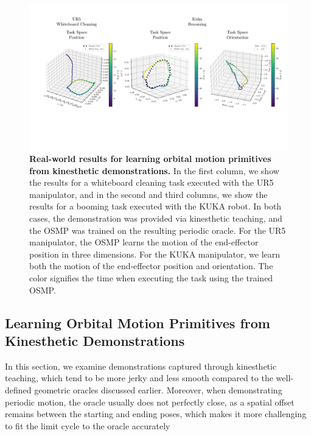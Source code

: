 \begin{figure}
    \centering
    \includegraphics[width=1.0\linewidth]{osmp/figures/kinesthetic_teaching_results/kinesthetic_teaching_results_v1_cropped.pdf}
    \caption{\textbf{Real-world results for learning orbital motion primitives from kinesthetic demonstrations.}
    In the first column, we show the results for a whiteboard cleaning task executed with the UR5 manipulator, and in the second and third columns, we show the results for a booming task executed with the KUKA robot.
    In both cases, the demonstration was provided via kinesthetic teaching, and the \gls{OSMP} was trained on the resulting periodic oracle.
    For the UR5 manipulator, the \gls{OSMP} learns the motion of the end-effector position in three dimensions. For the KUKA manipulator, we learn both the motion of the end-effector position and orientation.
    The color signifies the time when executing the task using the trained \gls{OSMP}.
    }
    \label{fig:osmp:kinesthetic_teaching_results}
\end{figure}

\subsection{Learning Orbital Motion Primitives from Kinesthetic Demonstrations}

In this section, we examine demonstrations captured through kinesthetic teaching, which tend to be more jerky and less smooth compared to the well-defined geometric oracles discussed earlier. Moreover, when demonstrating periodic motion, the oracle usually does not perfectly close, as a spatial offset remains between the starting and ending poses, which makes it more challenging to fit the limit cycle to the oracle accurately

